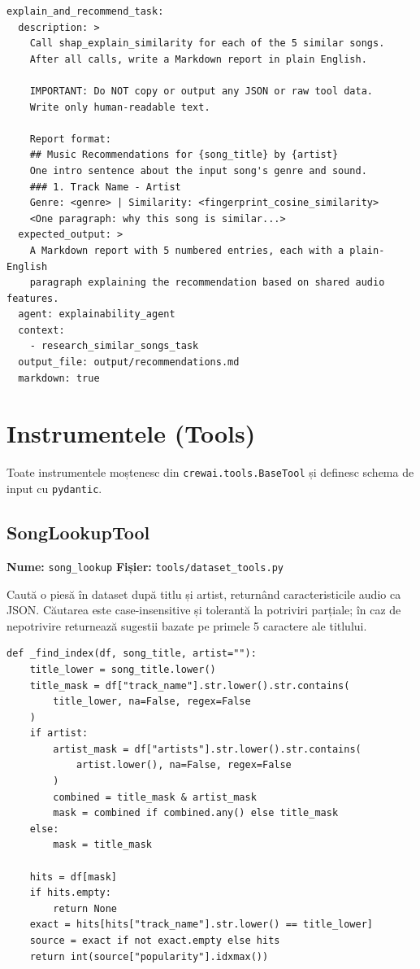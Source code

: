 \documentclass[12pt,a4paper]{report}
\begin{document}
\begin{lstlisting}[style=yaml, caption={Definiția task-ului explain\_and\_recommend\_task}]
explain_and_recommend_task:
  description: >
    Call shap_explain_similarity for each of the 5 similar songs.
    After all calls, write a Markdown report in plain English.

    IMPORTANT: Do NOT copy or output any JSON or raw tool data.
    Write only human-readable text.

    Report format:
    ## Music Recommendations for {song_title} by {artist}
    One intro sentence about the input song's genre and sound.
    ### 1. Track Name - Artist
    Genre: <genre> | Similarity: <fingerprint_cosine_similarity>
    <One paragraph: why this song is similar...>
  expected_output: >
    A Markdown report with 5 numbered entries, each with a plain-English
    paragraph explaining the recommendation based on shared audio features.
  agent: explainability_agent
  context:
    - research_similar_songs_task
  output_file: output/recommendations.md
  markdown: true
\end{lstlisting}

\chapter{Instrumentele (Tools)}

Toate instrumentele moștenesc din \texttt{crewai.tools.BaseTool} și definesc
schema de input cu \texttt{pydantic}.

\section{SongLookupTool}

\textbf{Nume:} \texttt{song\_lookup} \quad
\textbf{Fișier:} \texttt{tools/dataset\_tools.py}

Caută o piesă în dataset după titlu și artist, returnând caracteristicile audio
ca JSON. Căutarea este case-insensitive și tolerantă la potriviri parțiale;
în caz de nepotrivire returnează sugestii bazate pe primele 5 caractere ale titlului.

\begin{lstlisting}[style=python, caption={Logica de căutare din SongLookupTool}]
def _find_index(df, song_title, artist=""):
    title_lower = song_title.lower()
    title_mask = df["track_name"].str.lower().str.contains(
        title_lower, na=False, regex=False
    )
    if artist:
        artist_mask = df["artists"].str.lower().str.contains(
            artist.lower(), na=False, regex=False
        )
        combined = title_mask & artist_mask
        mask = combined if combined.any() else title_mask
    else:
        mask = title_mask

    hits = df[mask]
    if hits.empty:
        return None
    exact = hits[hits["track_name"].str.lower() == title_lower]
    source = exact if not exact.empty else hits
    return int(source["popularity"].idxmax())
\end{lstlisting}
\end{document}
